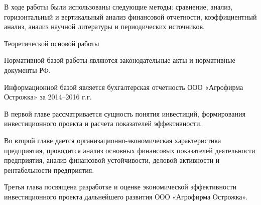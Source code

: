 В ходе работы были использованы следующие методы: сравнение, анализ, горизонтальный и вертикальный анализ финансовой отчетности, коэффициентный анализ, анализ научной литературы и периодических источников.

Теоретической основой работы 

Нормативной базой работы являются законодательные акты и нормативные документы РФ.

Информационной базой является бухгалтерская отчетность ООО «Агрофирма Острожка» за 2014--2016 г.г.

В первой главе рассматривается сущность понятия инвестиций, формирования инвестиционного проекта и расчета показателей эффективности.

Во второй главе дается организационно-экономическая характеристика предприятия, проводится анализ основных финансовых показателей деятельности предприятия, анализ финансовой устойчивости, деловой активности и рентабельности предприятия.

Третья глава посвящена разработке и оценке экономической эффективности инвестиционного проекта дальнейшего развития ООО «Агрофирма Острожка».
